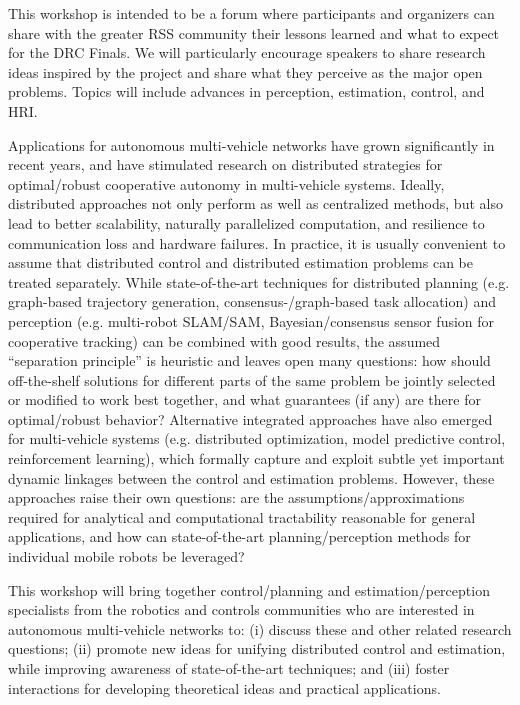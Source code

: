 \begin{spacing}{1.0}
{This workshop is intended to be a forum where participants and organizers can share with the greater RSS community their lessons learned and what to expect for the DRC Finals. We will particularly encourage speakers to share research ideas inspired by the project and share what they perceive as the major open problems. Topics will include advances in perception, estimation, control, and HRI.
}


{
Applications for autonomous multi-vehicle networks have grown significantly in recent years, and have stimulated research on distributed strategies for optimal/robust cooperative autonomy in multi-vehicle systems. Ideally, distributed approaches not only perform as well as centralized methods, but also lead to better scalability, naturally parallelized computation, and resilience to communication loss and hardware failures. In practice, it is usually convenient to assume that distributed control and distributed estimation problems can be treated separately. While state-of-the-art techniques for distributed planning (e.g. graph-based trajectory generation, consensus-/graph-based task allocation) and perception (e.g. multi-robot SLAM/SAM, Bayesian/consensus sensor fusion for cooperative tracking) can be combined with good results, the assumed “separation principle” is heuristic and leaves open many questions: how should off-the-shelf solutions for different parts of the same problem be jointly selected or modified to work best together, and what guarantees (if any) are there for optimal/robust behavior? Alternative integrated approaches have also emerged for multi-vehicle systems (e.g. distributed optimization, model predictive control, reinforcement learning), which formally capture and exploit subtle yet important dynamic linkages between the control and estimation problems. However, these approaches raise their own questions: are the assumptions/approximations required for analytical and computational tractability reasonable for general applications, and how can state-of-the-art planning/perception methods for individual mobile robots be leveraged?

This workshop will bring together control/planning and estimation/perception specialists from the robotics and controls communities who are interested in autonomous multi-vehicle networks to: (i) discuss these and other related research questions; (ii) promote new ideas for unifying distributed control and estimation, while improving awareness of state-of-the-art techniques; and (iii) foster interactions for developing theoretical ideas and practical applications.
}


\end{spacing}
